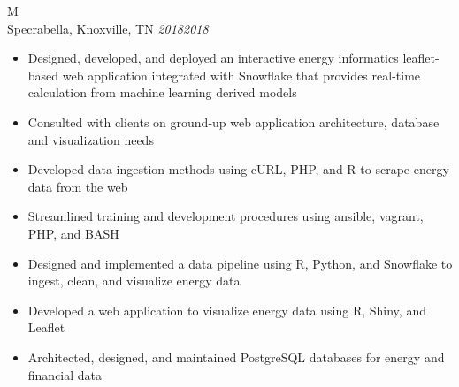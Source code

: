 \documentclass[10pt]{article}%
\begin{document}
    \begin{tabularx}{\linewidth}{M}%
         \\
        Specrabella, Knoxville, TN \textit{2018\textemdash{}2018} \\
        \begin{itemize}[topsep=-12pt,parsep=0em]
            \setlength\itemsep{0em}
            \item Designed, developed, and deployed an interactive energy informatics leaflet-based web application integrated with Snowflake that provides real-time calculation from machine learning derived models %
            \item Consulted with clients on ground-up web application architecture, database and visualization needs%
            \item Developed data ingestion methods using cURL, PHP, and R to scrape energy data from the web %
            \item Streamlined training and development procedures using ansible, vagrant, PHP, and BASH %
            \item Designed and implemented a data pipeline using R, Python, and Snowflake to ingest, clean, and visualize energy data %
            \item Developed a web application to visualize energy data using R, Shiny, and Leaflet %
            \item Architected, designed, and maintained PostgreSQL databases for energy and financial data %
        \end{itemize}
        \end{tabularx}
\end{document}
